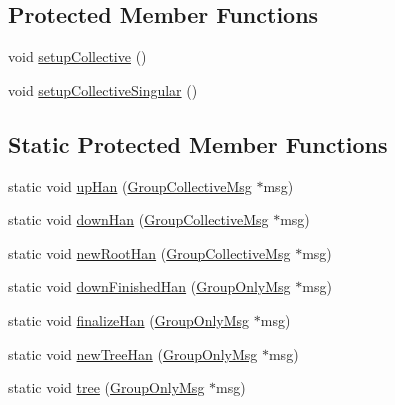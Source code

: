 \subsection*{Protected Member Functions}
\begin{DoxyCompactItemize}
\item 
void \hyperlink{structvt_1_1group_1_1_info_coll_ad6053b31361b42674c4a72cc076e4636}{setup\+Collective} ()
\item 
void \hyperlink{structvt_1_1group_1_1_info_coll_a89ff0c94d9e1019761d7fb019835621c}{setup\+Collective\+Singular} ()
\end{DoxyCompactItemize}
\subsection*{Static Protected Member Functions}
\begin{DoxyCompactItemize}
\item 
static void \hyperlink{structvt_1_1group_1_1_info_coll_a18031bc67be6fe75bf4bb04dbf4f5156}{up\+Han} (\hyperlink{namespacevt_1_1group_a4c1183efe0185992fefb3ab38a55a8a7}{Group\+Collective\+Msg} $\ast$msg)
\item 
static void \hyperlink{structvt_1_1group_1_1_info_coll_a39c744a7ce406b9e14173aef499c6458}{down\+Han} (\hyperlink{namespacevt_1_1group_a4c1183efe0185992fefb3ab38a55a8a7}{Group\+Collective\+Msg} $\ast$msg)
\item 
static void \hyperlink{structvt_1_1group_1_1_info_coll_a1c37f69107e014a3aef10346e5ebe0c7}{new\+Root\+Han} (\hyperlink{namespacevt_1_1group_a4c1183efe0185992fefb3ab38a55a8a7}{Group\+Collective\+Msg} $\ast$msg)
\item 
static void \hyperlink{structvt_1_1group_1_1_info_coll_ac932b886b6e0beac88966f0f0edae68a}{down\+Finished\+Han} (\hyperlink{namespacevt_1_1group_a864fcf6bc821eacf8350bf4ad15e51b3}{Group\+Only\+Msg} $\ast$msg)
\item 
static void \hyperlink{structvt_1_1group_1_1_info_coll_a6988596b1faad0eb1ba49a2bd54e52e8}{finalize\+Han} (\hyperlink{namespacevt_1_1group_a864fcf6bc821eacf8350bf4ad15e51b3}{Group\+Only\+Msg} $\ast$msg)
\item 
static void \hyperlink{structvt_1_1group_1_1_info_coll_ac0054acdfecccf525613a95997d79e20}{new\+Tree\+Han} (\hyperlink{namespacevt_1_1group_a864fcf6bc821eacf8350bf4ad15e51b3}{Group\+Only\+Msg} $\ast$msg)
\item 
static void \hyperlink{structvt_1_1group_1_1_info_coll_a9adf8eaa0ccf1115e2b015f170a7d83e}{tree} (\hyperlink{namespacevt_1_1group_a864fcf6bc821eacf8350bf4ad15e51b3}{Group\+Only\+Msg} $\ast$msg)
\end{DoxyCompactItemize}
